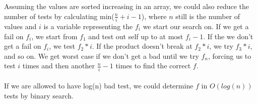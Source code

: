 \documentclass[12pt,oneside,reqno]{amsart}
\begin{document}
Assuming the values are sorted increasing in an array, we could also reduce the number of tests by calculating min($\frac{n}{i}+i-1$), where $n$ still is the number of values and $i$ is a variable representing the $f_i$ we start our search on. If we get a fail on $f_i$, we start from $f_1$ and test out self up to at most $f_i-1$. If the we don't get a fail on $f_i$, we test $f_2*i$. If the product doesn't break at $f_2*i$, we try $f_3*i$, and so on. We get worst case if we don't get a bad until we try $f_n$, forcing us to test $i$ times and then another $\frac{n}{i}-1$ times to find the correct $f$.\\\\
If we are allowed to have log(n) bad test, we could determine $f$ in $O(log(n))$ tests by binary search.
\end{document}
